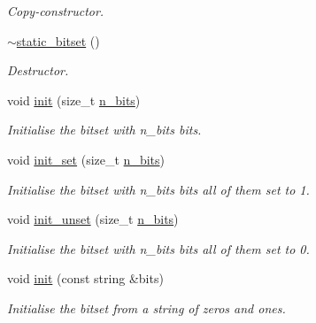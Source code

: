 \begin{DoxyCompactItemize}
\begin{DoxyCompactList}\small\item\em Copy-\/constructor. \end{DoxyCompactList}\item 
\hyperlink{classlgraph_1_1utils_1_1static__bitset_aabbb46d8283fffa38b39204b204999be}{$\sim$static\+\_\+bitset} ()\hypertarget{classlgraph_1_1utils_1_1static__bitset_aabbb46d8283fffa38b39204b204999be}{}\label{classlgraph_1_1utils_1_1static__bitset_aabbb46d8283fffa38b39204b204999be}

\begin{DoxyCompactList}\small\item\em Destructor. \end{DoxyCompactList}\item 
void \hyperlink{classlgraph_1_1utils_1_1static__bitset_afad1ede9e08c9d59b641150d2203edca}{init} (size\+\_\+t \hyperlink{classlgraph_1_1utils_1_1static__bitset_aebc02986838d70f13d3c10f390d11211}{n\+\_\+bits})
\begin{DoxyCompactList}\small\item\em Initialise the bitset with {\itshape n\+\_\+bits} bits. \end{DoxyCompactList}\item 
void \hyperlink{classlgraph_1_1utils_1_1static__bitset_a706ac4c15ed634b9087582cacc107acc}{init\+\_\+set} (size\+\_\+t \hyperlink{classlgraph_1_1utils_1_1static__bitset_aebc02986838d70f13d3c10f390d11211}{n\+\_\+bits})
\begin{DoxyCompactList}\small\item\em Initialise the bitset with {\itshape n\+\_\+bits} bits all of them set to 1. \end{DoxyCompactList}\item 
void \hyperlink{classlgraph_1_1utils_1_1static__bitset_a6fb4d66f266593fe9c65451bf6212591}{init\+\_\+unset} (size\+\_\+t \hyperlink{classlgraph_1_1utils_1_1static__bitset_aebc02986838d70f13d3c10f390d11211}{n\+\_\+bits})
\begin{DoxyCompactList}\small\item\em Initialise the bitset with {\itshape n\+\_\+bits} bits all of them set to 0. \end{DoxyCompactList}\item 
void \hyperlink{classlgraph_1_1utils_1_1static__bitset_a29e5c03c1895adbae2acc04f9cfb6a0f}{init} (const string \&bits)
\begin{DoxyCompactList}\small\item\em Initialise the bitset from a string of zeros and ones. \end{DoxyCompactList}\item 

\end{DoxyCompactItemize}
